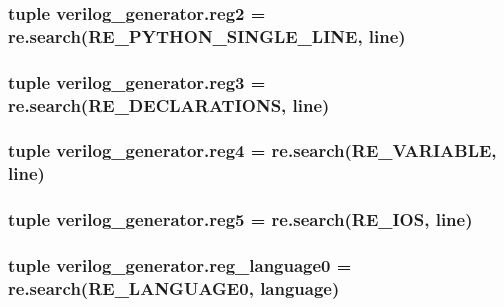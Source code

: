 \hypertarget{namespaceverilog__generator_a6b3383556e2c69bec3df7179edb9abd5}{
\subsubsection[{reg2}]{\setlength{\rightskip}{0pt plus 5cm}tuple verilog\-\_\-generator.\-reg2 = re.\-search({\bf R\-E\-\_\-\-P\-Y\-T\-H\-O\-N\-\_\-\-S\-I\-N\-G\-L\-E\-\_\-\-L\-I\-N\-E}, line)}}\label{namespaceverilog__generator_a6b3383556e2c69bec3df7179edb9abd5}
\hypertarget{namespaceverilog__generator_a67d70c910cdff4ddb30f5578ec4b4593}{
\subsubsection[{reg3}]{\setlength{\rightskip}{0pt plus 5cm}tuple verilog\-\_\-generator.\-reg3 = re.\-search({\bf R\-E\-\_\-\-D\-E\-C\-L\-A\-R\-A\-T\-I\-O\-N\-S}, line)}}\label{namespaceverilog__generator_a67d70c910cdff4ddb30f5578ec4b4593}
\hypertarget{namespaceverilog__generator_a1e0b192cfe4308b8276b1dd2e4b84812}{
\subsubsection[{reg4}]{\setlength{\rightskip}{0pt plus 5cm}tuple verilog\-\_\-generator.\-reg4 = re.\-search({\bf R\-E\-\_\-\-V\-A\-R\-I\-A\-B\-L\-E}, line)}}\label{namespaceverilog__generator_a1e0b192cfe4308b8276b1dd2e4b84812}
\hypertarget{namespaceverilog__generator_a206dc8afa200c2596681d5f885a8d1df}{
\subsubsection[{reg5}]{\setlength{\rightskip}{0pt plus 5cm}tuple verilog\-\_\-generator.\-reg5 = re.\-search({\bf R\-E\-\_\-\-I\-O\-S}, line)}}\label{namespaceverilog__generator_a206dc8afa200c2596681d5f885a8d1df}
\hypertarget{namespaceverilog__generator_acbf04d1286f0d2641bb2f82f7929d958}{
\subsubsection[{reg\-\_\-language0}]{\setlength{\rightskip}{0pt plus 5cm}tuple verilog\-\_\-generator.\-reg\-\_\-language0 = re.\-search({\bf R\-E\-\_\-\-L\-A\-N\-G\-U\-A\-G\-E0}, {\bf language})}}\label{namespaceverilog__generator_acbf04d1286f0d2641bb2f82f7929d958}

